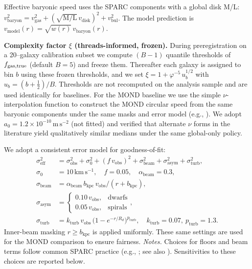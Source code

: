 \documentclass[usenatbib]{mnras}
\begin{document}
Effective baryonic speed uses the SPARC components with a global disk M/L: $v_\mathrm{baryon}^2 = v_\mathrm{gas}^2 + (\sqrt{\mathrm{M/L}}\,v_\mathrm{disk})^2 + v_\mathrm{bul}^2$. The model prediction is $v_\mathrm{model}(r) = \sqrt{w(r)}\, v_\mathrm{baryon}(r)$.

\noindent\textbf{Complexity factor $\xi$ (threads-informed, frozen).}
During preregistration on a 20–galaxy calibration subset we compute $(B{-}1)$ quantile thresholds of $f_{\rm gas,true}$ (default $B{=}5$) and freeze them. Thereafter each galaxy is assigned to bin $b$ using these frozen thresholds, and we set $\xi=1+\varphi^{-5}\,u_b^{1/2}$ with $u_b=(b+\tfrac{1}{2})/B$. Thresholds are not recomputed on the analysis sample and are used identically for baselines.
For the MOND baseline we use the simple $\nu$-interpolation function to construct the MOND circular speed from the same baryonic components under the same masks and error model (e.g., \citealp{famaey2012}). We adopt $a_0 = 1.2\times 10^{-10}\,\mathrm{m\,s^{-2}}$ (not fitted) and verified that alternate $\nu$ forms in the literature yield qualitatively similar medians under the same global-only policy.

We adopt a consistent error model for goodness-of-fit:
\begin{align}
\sigma_\mathrm{eff}^2 &= \sigma_\mathrm{obs}^2 + \sigma_0^2 + (f\,v_\mathrm{obs})^2 + \sigma_\mathrm{beam}^2 + \sigma_\mathrm{asym}^2 + \sigma_\mathrm{turb}^2,\\
\sigma_0 &= 10\,\mathrm{km\,s^{-1}},\quad f = 0.05,\quad \alpha_\mathrm{beam}=0.3,\\
\sigma_\mathrm{beam} &= \alpha_\mathrm{beam}\, b_\mathrm{kpc}\, v_\mathrm{obs}/(r+b_\mathrm{kpc}),\\
\sigma_\mathrm{asym} &= \begin{cases}0.10\,v_\mathrm{obs}, & \text{dwarfs}\\ 0.05\,v_\mathrm{obs}, & \text{spirals}\end{cases},\\
\sigma_\mathrm{turb} &= k_\mathrm{turb}\, v_\mathrm{obs}\,\big(1-e^{-r/R_d}\big)^{p_\mathrm{turb}},\quad k_\mathrm{turb}=0.07,\ p_\mathrm{turb}=1.3.
\end{align}
Inner-beam masking $r\ge b_\mathrm{kpc}$ is applied uniformly. These same settings are used for the MOND comparison to ensure fairness.
\noindent\textit{Notes.} Choices for floors and beam terms follow common SPARC practice (e.g., \citealp{lelli2016sparc}; see also \citealp{mcgaugh2016}). Sensitivities to these choices are reported below.
\end{document}
